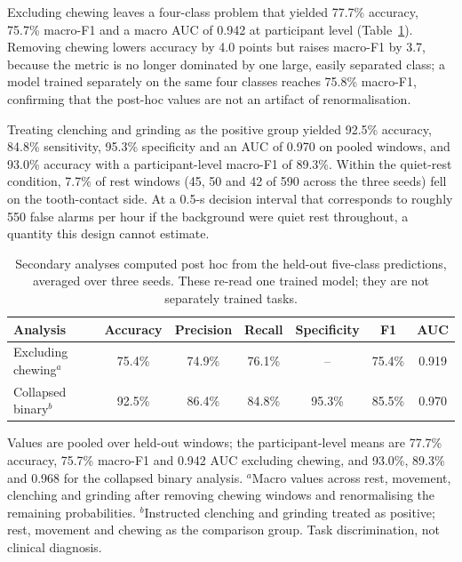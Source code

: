 \documentclass[pdflatex,sn-nature,iicol]{sn-jnl}
\begin{document}
Excluding chewing leaves a four-class problem that yielded 77.7\% accuracy, 75.7\% macro-F1 and a macro AUC of 0.942 at participant level (Table~\ref{tab:sensitivity}). Removing chewing lowers accuracy by 4.0 points but raises macro-F1 by 3.7, because the metric is no longer dominated by one large, easily separated class; a model trained separately on the same four classes reaches 75.8\% macro-F1, confirming that the post-hoc values are not an artifact of renormalisation.

Treating clenching and grinding as the positive group yielded 92.5\% accuracy, 84.8\% sensitivity, 95.3\% specificity and an AUC of 0.970 on pooled windows, and 93.0\% accuracy with a participant-level macro-F1 of 89.3\%. Within the quiet-rest condition, 7.7\% of rest windows (45, 50 and 42 of 590 across the three seeds) fell on the tooth-contact side. At a 0.5-s decision interval that corresponds to roughly 550 false alarms per hour if the background were quiet rest throughout, a quantity this design cannot estimate.

\begin{table}[t]
  \caption{Secondary analyses computed post hoc from the held-out five-class predictions, averaged over three seeds. These re-read one trained model; they are not separately trained tasks.}
  \label{tab:sensitivity}
  \centering
  \footnotesize
  \begin{tabular*}{\textwidth}{@{\extracolsep{\fill}}lcccccc@{}}
    \toprule
    Analysis & Accuracy & Precision & Recall & Specificity & F1 & AUC \\
    \midrule
    Excluding chewing$^{a}$ & 75.4\% & 74.9\% & 76.1\% & -- & 75.4\% & 0.919 \\
    Collapsed binary$^{b}$ & 92.5\% & 86.4\% & 84.8\% & 95.3\% & 85.5\% & 0.970 \\
    \bottomrule
  \end{tabular*}
  \begin{flushleft}\footnotesize
  Values are pooled over held-out windows; the participant-level means are 77.7\% accuracy, 75.7\% macro-F1 and 0.942 AUC excluding chewing, and 93.0\%, 89.3\% and 0.968 for the collapsed binary analysis.
  $^{a}$Macro values across rest, movement, clenching and grinding after removing chewing windows and renormalising the remaining probabilities.
  $^{b}$Instructed clenching and grinding treated as positive; rest, movement and chewing as the comparison group. Task discrimination, not clinical diagnosis.
  \end{flushleft}
\end{table}
\end{document}
